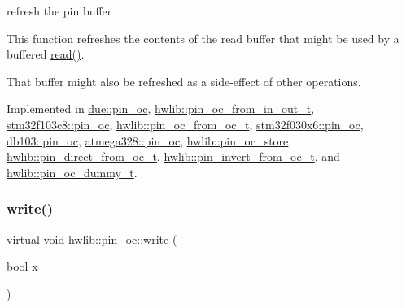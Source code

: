 refresh the pin buffer

This function refreshes the contents of the read buffer that might be used by a buffered \hyperlink{classhwlib_1_1pin__oc_a51180afd605add59b96105fa98e29f88}{read()}.

That buffer might also be refreshed as a side-\/effect of other operations. 

Implemented in \hyperlink{classdue_1_1pin__oc_a9cda433d0079aee45a282f07efe2fee3}{due\+::pin\+\_\+oc}, \hyperlink{classhwlib_1_1pin__oc__from__in__out__t_a99df420aaed9a39dad71658b9483c002}{hwlib\+::pin\+\_\+oc\+\_\+from\+\_\+in\+\_\+out\+\_\+t}, \hyperlink{classstm32f103c8_1_1pin__oc_a6f063df5c0c2a290ed095b26faab4aab}{stm32f103c8\+::pin\+\_\+oc}, \hyperlink{classhwlib_1_1pin__oc__from__oc__t_a2bdf7192ad976dab785df8874267420d}{hwlib\+::pin\+\_\+oc\+\_\+from\+\_\+oc\+\_\+t}, \hyperlink{classstm32f030x6_1_1pin__oc_ab856468835abcd32a9161b94c789ec7d}{stm32f030x6\+::pin\+\_\+oc}, \hyperlink{classdb103_1_1pin__oc_af033054181da84fd2392f611ca391ee3}{db103\+::pin\+\_\+oc}, \hyperlink{classatmega328_1_1pin__oc_a1768ece62a74ed6f657427cb0db5b5e3}{atmega328\+::pin\+\_\+oc}, \hyperlink{classhwlib_1_1pin__oc__store_ac78956e4f8a142e4fa4076bddd1db190}{hwlib\+::pin\+\_\+oc\+\_\+store}, \hyperlink{classhwlib_1_1pin__direct__from__oc__t_ab18895f60f0b8f314da92711176d3464}{hwlib\+::pin\+\_\+direct\+\_\+from\+\_\+oc\+\_\+t}, \hyperlink{classhwlib_1_1pin__invert__from__oc__t_ab2394ce2e52a3dd16a22663436d000f7}{hwlib\+::pin\+\_\+invert\+\_\+from\+\_\+oc\+\_\+t}, and \hyperlink{classhwlib_1_1pin__oc__dummy__t_a3609bb12b15736b0ad6d734c1d45ae49}{hwlib\+::pin\+\_\+oc\+\_\+dummy\+\_\+t}.

\mbox{\label{classhwlib_1_1pin__oc_a4429dd7dc80858a213bb157f4ac5def3}} 
\subsubsection{\texorpdfstring{write()}{write()}}
{\footnotesize\ttfamily virtual void hwlib\+::pin\+\_\+oc\+::write (\begin{DoxyParamCaption}\item[{bool}]{x }\end{DoxyParamCaption})\hspace{0.3cm}{\ttfamily [pure virtual]}}






